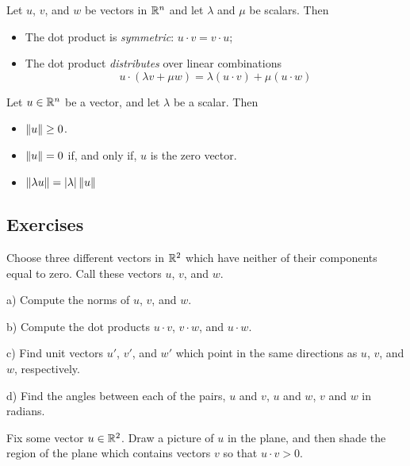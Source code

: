 \documentclass[elementsmain.tex]{subfiles}
\begin{document}
\begin{theorem}
Let $u$, $v$, and $w$ be vectors in $\mathbb{R}^n$ and let $\lambda$ and $\mu$ be scalars. Then
\begin{itemize}
\item The dot product is \emph{symmetric}: $u\cdot v = v \cdot u$;
\item The dot product \emph{distributes} over linear combinations 
\[
u \cdot (\lambda v + \mu w) = \lambda (u\cdot v) + \mu (u\cdot w)
\]
\end{itemize}
\end{theorem}


\begin{theorem}
Let $u \in \mathbb{R}^n$ be a vector, and let $\lambda$ be a scalar. Then 
\begin{itemize}
\item $\left\|u\right\| \geq 0$.
\item $\left\|u\right\| = 0$ if, and only if, $u$ is the zero vector.
\item $\left\|\lambda u\right\| = |\lambda| \left\|u\right\|$
\end{itemize}
\end{theorem}


\clearpage

\subsection*{Exercises}

\begin{exercise}
Choose three different vectors in $\mathbb{R}^2$ which have neither of their components equal to zero. Call these vectors $u$, $v$, and $w$.
\begin{compactitem}
\item[a)] Compute the norms of $u$, $v$, and $w$.
\item[b)] Compute the dot products $u\cdot v$, $v\cdot w$, and $u\cdot w$.
\item[c)] Find unit vectors $u'$, $v'$, and $w'$ which point in the same directions as $u$, $v$, and $w$, respectively.
\item[d)] Find the angles between each of the pairs, $u$ and $v$, $u$ and $w$, $v$ and $w$ in radians.
\end{compactitem}
\end{exercise}



\begin{exercise}
Fix some vector $u \in\mathbb{R}^2$. Draw a picture of $u$ in the plane, and then shade the region of the plane which contains vectors $v$ so that $u\cdot v> 0$.
\end{exercise}
\end{document}
